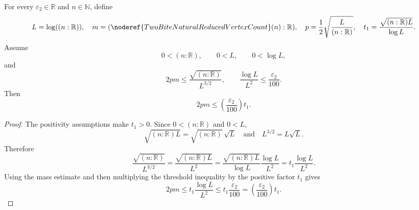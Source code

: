 \begin{helper}
For every \(\varepsilon_2\in\mathbb R\) and \(n\in\mathbb N\), define
\[
L=\log((n:\mathbb R)),\quad
m=(\noderef{TwoBiteNaturalReducedVertexCount}(n):\mathbb R),\quad
p=\frac12\sqrt{\frac{L}{(n:\mathbb R)}},\quad
t_1=\frac{\sqrt{(n:\mathbb R)L}}{\log L}.
\]
Assume
\[
0<(n:\mathbb R),\qquad 0<L,\qquad 0<\log L,
\]
and
\[
2pm\le\frac{\sqrt{(n:\mathbb R)}}{L^{3/2}},
\qquad
\frac{\log L}{L^2}\le\frac{\varepsilon_2}{100}.
\]
Then
\[
2pm\le\left(\frac{\varepsilon_2}{100}\right)t_1.
\]
\end{helper}
\begin{proof}
The positivity assumptions make \(t_1>0\).  Since \(0<(n:\mathbb R)\) and
\(0<L\),
\[
\sqrt{(n:\mathbb R)L}=\sqrt{(n:\mathbb R)}\,\sqrt L
\quad\text{and}\quad
L^{3/2}=L\sqrt L.
\]
Therefore
\[
\frac{\sqrt{(n:\mathbb R)}}{L^{3/2}}
=\frac{\sqrt{(n:\mathbb R)L}}{L^2}
=\frac{\sqrt{(n:\mathbb R)L}}{\log L}\frac{\log L}{L^2}
=t_1\frac{\log L}{L^2}.
\]
Using the mass estimate and then multiplying the threshold inequality by the
positive factor \(t_1\) gives
\[
2pm\le t_1\frac{\log L}{L^2}
\le t_1\frac{\varepsilon_2}{100}
=\left(\frac{\varepsilon_2}{100}\right)t_1.
\]
\end{proof}
